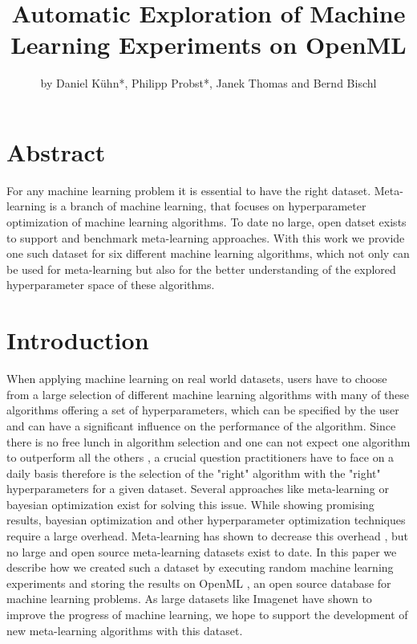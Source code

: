 \documentclass{article}
\begin{document}


\title{Automatic Exploration of Machine Learning Experiments on OpenML}
\author{by Daniel Kühn*, Philipp Probst*, Janek Thomas and Bernd Bischl}

\maketitle

\section*{Abstract}
For any machine learning problem it is essential to have the right dataset. Meta-learning is a branch of machine learning, that focuses on hyperparameter optimization of machine learning algorithms. To date no large, open datset exists to support and benchmark meta-learning approaches. With this work we provide one such dataset for six different machine learning algorithms, which not only can be used for meta-learning but also for the better understanding of the explored hyperparameter space of these algorithms. 

\section{Introduction}

When applying machine learning on real world datasets, users have to choose from a large selection of different machine learning algorithms with many of these algorithms offering a set of hyperparameters, which can be specified by the user and can have a significant influence on the performance of the algorithm. Since there is no free lunch in algorithm selection and one can not expect one algorithm to outperform all the others \citep{Wolpert2001}, a crucial question practitioners have to face on a daily basis therefore is the selection of the "right" algorithm with the "right" hyperparameters for a given dataset. Several approaches like meta-learning or bayesian optimization exist for solving this issue. While showing promising results, bayesian optimization and other hyperparameter optimization techniques require a large overhead. Meta-learning has shown to decrease this overhead \citep{Feurer2015}, but no large and open source meta-learning datasets exist to date.
In this paper we describe how we created such a dataset by executing random machine learning experiments and storing the results on OpenML \citep{OpenML2013}, an open source database for machine learning problems. As large datasets like Imagenet \citep{ImageNet2009} have shown to improve the progress of machine learning, we hope to support the development of new meta-learning algorithms with this dataset. 
\end{document}
